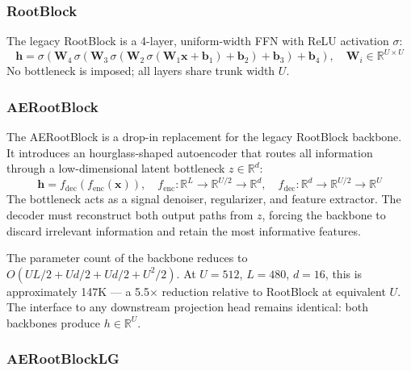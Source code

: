 \documentclass[11pt,a4paper]{article}
\begin{document}
\subsubsection{RootBlock}

The legacy RootBlock is a 4-layer, uniform-width FFN with ReLU activation $\sigma$:
\begin{equation*}
\mathbf{h} = \sigma\!\left(\mathbf{W}_4\,\sigma\!\left(\mathbf{W}_3\,\sigma\!\left(\mathbf{W}_2\,\sigma(\mathbf{W}_1\mathbf{x}+\mathbf{b}_1)+\mathbf{b}_2\right)+\mathbf{b}_3\right)+\mathbf{b}_4\right), \quad \mathbf{W}_i \in \mathbb{R}^{U\times U}
\end{equation*}
No bottleneck is imposed; all layers share trunk width $U$.

\subsubsection{AERootBlock}

The AERootBlock is a drop-in replacement for the legacy RootBlock backbone. It introduces an hourglass-shaped autoencoder that routes all information through a low-dimensional latent bottleneck $z \in \mathbb{R}^{d}$:
\begin{equation*}
\mathbf{h} = f_{\mathrm{dec}}(f_{\mathrm{enc}}(\mathbf{x})), \quad f_{\mathrm{enc}}: \mathbb{R}^L \!\to\! \mathbb{R}^{U/2} \!\to\! \mathbb{R}^{d}, \quad f_{\mathrm{dec}}: \mathbb{R}^{d} \!\to\! \mathbb{R}^{U/2} \!\to\! \mathbb{R}^U
\end{equation*}
The bottleneck acts as a signal denoiser, regularizer, and feature extractor. The decoder must reconstruct both output paths from $z$, forcing the backbone to discard irrelevant information and retain the most informative features.

The parameter count of the backbone reduces to $O(UL/2 + Ud/2 + Ud/2 + U^2/2)$. At $U = 512$, $L = 480$, $d = 16$, this is approximately 147K --- a 5.5$\times$ reduction relative to RootBlock at equivalent $U$. The interface to any downstream projection head remains identical: both backbones produce $h \in \mathbb{R}^U$.

\subsubsection{AERootBlockLG}
\end{document}

